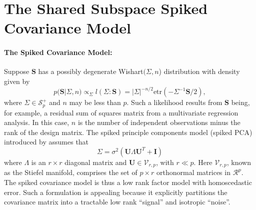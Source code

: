 \documentclass{article}
\newcommand{\bl}[1]{{\mathbf #1}}
\newcommand{\etr}{\text{etr}}
\begin{document}
\section{The Shared Subspace Spiked Covariance Model}
\label{sec:shared}

\paragraph{The Spiked Covariance Model:}

Suppose $\bl S$ has a possibly degenerate Wishart$(\Sigma,n$)
distribution with density given by
\begin{equation} 
p(\bl S | \Sigma, n) \propto_{\Sigma} l(\Sigma:\bl S) =  |\Sigma|^{-n/2} \text{etr}( - \Sigma^{-1} \bl S/2 ) ,  
\label{eqn:lik}
\end{equation}
%
\noindent where $\Sigma \in \mathcal S_p^+$ and $n$ may be less than $p$.  Such
a likelihood results from $\bl S$ being, for example, a residual sum
of squares matrix from a multivariate regression analysis. In this
case, $n$ is the number of independent observations minus the rank of
the design matrix.  The spiked principle components model (spiked PCA)
introduced by \citet{Johnstone2001} assumes that
\begin{equation} 
\Sigma = \sigma^2 (  \bl U  \Lambda  \bl U^T  + \bl I )
\label{eqn:spiked}
\end{equation}
%
\noindent where $\Lambda$ is an $r\times r$ diagonal matrix and
$\bl U \in \mathcal V_{r,p}$, with $r \ll p$. Here $\mathcal V_{r,p}$,
known as the Stiefel manifold, comprises the set of $p \times r$
orthonormal matrices in $\mathcal{R}^p$.  The spiked covariance model
is thus a low rank factor model with homoscedastic error.  Such a
formulation is appealing because it explicitly partitions the
covariance matrix into a tractable low rank ``signal'' and isotropic
``noise''.

\end{document}
